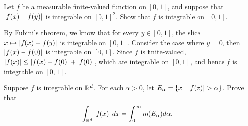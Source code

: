 \begin{exercise}
    Let $f$ be a measurable finite-valued function on $[0,1]$, and 
    suppose that $\left\lvert {f(x)-f(y)} \right\rvert$ is integrable on $[0,1]^2$. Show 
    that $f$ is integrable on $[0,1]$.
\end{exercise}
\begin{pf}
    By Fubini's theorem, we know that for every $y\in[0,1]$, 
    the slice $x\mapsto\left\lvert {f(x)-f(y)} \right\rvert$ is integrable on $[0,1]$. 
    Consider the case where $y=0$, then $\left\lvert {f(x)-f(0)} \right\rvert$ is 
    integrable on $[0,1]$. Since $f$ is finite-valued, 
    $\left\lvert {f(x)} \right\rvert\leq \left\lvert {f(x)-f(0)} \right\rvert+\left\lvert {f(0)} \right\rvert$, which are 
    integrable on $[0,1]$, and hence $f$ is integrable on 
    $[0,1]$.
\end{pf}

\begin{exercise}
    Suppose $f$ is integrable on $\mathbb{R}^d$. For each $\alpha>0$, 
    let $E_\alpha = \left\{ x \;\middle\vert\; \left\lvert {f(x)} \right\rvert>\alpha \right\}$. Prove that 
    \begin{equation*}
        \int_{\mathbb{R}^d} \left\lvert {f(x)} \right\rvert dx = \int_{0}^{\infty} m(E_\alpha)d\alpha.
    \end{equation*}
\end{exercise}